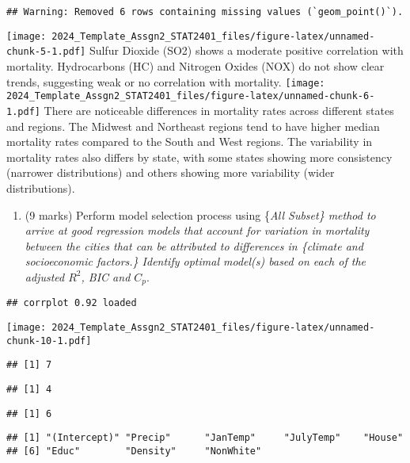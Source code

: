 \documentclass[
]{article}
\providecommand{\tightlist}{%
  \setlength{\itemsep}{0pt}\setlength{\parskip}{0pt}}
\begin{document}
\begin{verbatim}
## Warning: Removed 6 rows containing missing values (`geom_point()`).
\end{verbatim}

\texttt{[image: 2024\_Template\_Assgn2\_STAT2401\_files/figure-latex/unnamed-chunk-5-1.pdf]}
Sulfur Dioxide (SO2) shows a moderate positive correlation with
mortality. Hydrocarbons (HC) and Nitrogen Oxides (NOX) do not show clear
trends, suggesting weak or no correlation with mortality.
\texttt{[image: 2024\_Template\_Assgn2\_STAT2401\_files/figure-latex/unnamed-chunk-6-1.pdf]}
There are noticeable differences in mortality rates across different
states and regions. The Midwest and Northeast regions tend to have
higher median mortality rates compared to the South and West regions.
The variability in mortality rates also differs by state, with some
states showing more consistency (narrower distributions) and others
showing more variability (wider distributions).

\begin{enumerate}
\def\labelenumi{(\alph{enumi})}
\setcounter{enumi}{1}
\tightlist
\item
  (9 marks) Perform model selection process using \{\it All Subset\}
  method to arrive at good regression models that account for variation
  in mortality between the cities that can be attributed to differences
  in \{\it  climate and socioeconomic factors.\} Identify optimal
  model(s) based on each of the adjusted \(R^2\), BIC and \(C_p.\)
\end{enumerate}

\begin{verbatim}
## corrplot 0.92 loaded
\end{verbatim}

\texttt{[image: 2024\_Template\_Assgn2\_STAT2401\_files/figure-latex/unnamed-chunk-10-1.pdf]}

\begin{verbatim}
## [1] 7
\end{verbatim}

\begin{verbatim}
## [1] 4
\end{verbatim}

\begin{verbatim}
## [1] 6
\end{verbatim}

\begin{verbatim}
## [1] "(Intercept)" "Precip"      "JanTemp"     "JulyTemp"    "House"      
## [6] "Educ"        "Density"     "NonWhite"
\end{verbatim}
\end{document}
